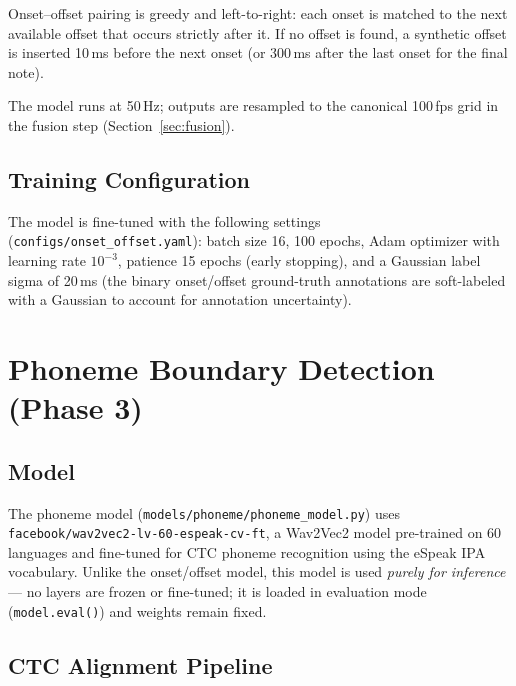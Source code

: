 \documentclass[11pt,letterpaper]{article}
\begin{document}
Onset--offset pairing is greedy and left-to-right: each onset is matched to
the next available offset that occurs strictly after it.
If no offset is found, a synthetic offset is inserted 10\,ms before the next
onset (or 300\,ms after the last onset for the final note).

The model runs at 50\,Hz; outputs are resampled to the canonical 100\,fps
grid in the fusion step (Section~\ref{sec:fusion}).

\subsection{Training Configuration}

The model is fine-tuned with the following settings
(\texttt{configs/onset\_offset.yaml}):
batch size 16, 100 epochs, Adam optimizer with learning rate $10^{-3}$,
patience 15 epochs (early stopping), and a Gaussian label sigma of 20\,ms
(the binary onset/offset ground-truth annotations are soft-labeled with a
Gaussian to account for annotation uncertainty).

\section{Phoneme Boundary Detection (Phase 3)}

\subsection{Model}

The phoneme model (\texttt{models/phoneme/phoneme\_model.py}) uses
\texttt{facebook/wav2vec2-lv-60-espeak-cv-ft}, a Wav2Vec2 model pre-trained on
60 languages and fine-tuned for CTC phoneme recognition using the eSpeak IPA
vocabulary.
Unlike the onset/offset model, this model is used \emph{purely for inference}
--- no layers are frozen or fine-tuned; it is loaded in evaluation mode
(\texttt{model.eval()}) and weights remain fixed.

\subsection{CTC Alignment Pipeline}
\end{document}
